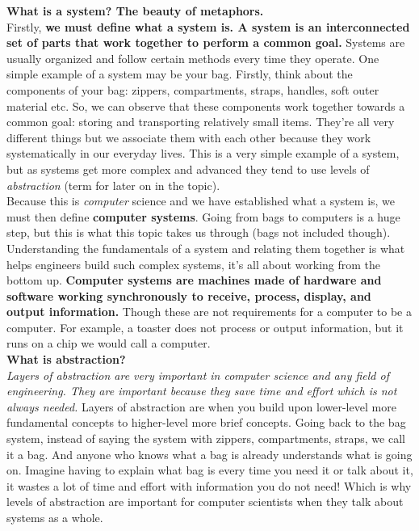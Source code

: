 \documentclass[12pt,a4paper]{article}
\begin{document}
{\color{red} \textbf{What is a system? The beauty of metaphors.}}\\
Firstly, \textbf{we must define what a system is. A system is an interconnected set of parts that work together to perform a common goal. }Systems are usually organized and follow certain methods every time they operate. One simple example of a system may be your bag. Firstly, think about the components of your bag: zippers, compartments, straps, handles, soft outer material etc. So, we can observe that these components work together towards a common goal: storing and transporting relatively small items. They're all very different things but we associate them with each other because they work systematically in our everyday lives. This is a very simple example of a system, but as systems get more complex and advanced they tend to use levels of \textit{abstraction} (term for later on in the topic).\\

Because this is \textit{computer} science and we have established what a system is, we must then define \textbf{computer systems}. Going from bags to computers is a huge step, but this is what this topic takes us through (bags not included though). Understanding the fundamentals of a system and relating them together is what helps engineers build such complex systems, it's all about working from the bottom up. \textbf{Computer systems are machines made of hardware and software working synchronously to receive, process, display, and output information.} Though these are not requirements for a computer to be a computer. For example, a toaster does not process or output information, but it runs on a chip we would call a computer.\\

{\color{red} \textbf{What is abstraction?}}\\
\textit{Layers of abstraction are very important in computer science and any field of engineering. They are important because they save time and effort which is not always needed.} Layers of abstraction are when you build upon lower-level more fundamental concepts to higher-level more brief concepts. Going back to the bag system, instead of saying the system with zippers, compartments, straps, we call it a bag. And anyone who knows what a bag is already understands what is going on. Imagine having to explain what bag is every time you need it or talk about it, it wastes a lot of time and effort with information you do not need! Which is why levels of abstraction are important for computer scientists when they talk about systems as a whole.\\
\end{document}
